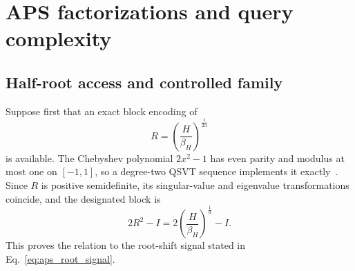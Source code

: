 \documentclass[aps,pra,reprint,floatfix,unsortedaddress,superscriptaddress]{revtex4-2}
\begin{document}
\section{APS factorizations and query complexity}
\label{app:aps}

\subsection{Half-root access and controlled family}

Suppose first that an exact block encoding of
\begin{equation}
    R=\left(\frac{H}{\beta_H}\right)^{\frac{1}{2\alpha}}
    \label{eq:aps_half_root}
\end{equation}
is available.  The Chebyshev polynomial $2x^2-1$ has even parity and
modulus at most one on $[-1,1]$, so a degree-two QSVT sequence implements
it exactly~\cite{Gilyen2019qsvt}.  Since $R$ is positive semidefinite, its singular-value and
eigenvalue transformations coincide, and the designated block is
\begin{equation}
    2R^2-I
    =2\left(\frac{H}{\beta_H}\right)^{\frac{1}{\alpha}}-I.
    \label{eq:aps_half_root_to_shift}
\end{equation}
This proves the relation to the root-shift signal stated in
Eq.~\eqref{eq:aps_root_signal}.
\end{document}
